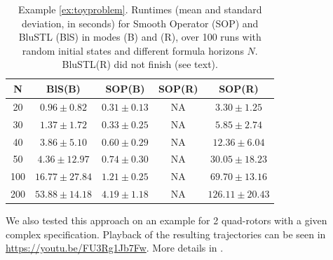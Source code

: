\begin{table}[tb]
\small
\begin{center}
\caption{{\small Example \ref{ex:toyproblem}. Runtimes (mean and standard deviation, in seconds) for Smooth Operator (SOP) and BluSTL (BlS) in modes (B) and (R), over 100 runs with random initial states and different formula horizons $N$. BluSTL(R) did not finish (see text).}}
\vspace{-5pt}
\label{tbl:time_performance_toy}
\begin{tabular} {|c|c|c|c|c|}
	\hline
	N & BlS(B) & SOP(B) & SOP(R) & SOP(R) \\ \hline
	20 & $0.96 \pm 0.82$ &  $\mathbf{0.31 \pm 0.13}$  & NA & $3.30 \pm 1.25$ \\ \hline
	30 & $1.37 \pm 1.72$ &  $\mathbf{0.33 \pm 0.25}$  & NA & $5.85 \pm 2.74$\\ \hline
	40 & $3.86 \pm 5.10$ &  $\mathbf{0.60 \pm 0.29}$  & NA & $12.36 \pm 6.04$\\ \hline
	50 & $4.36 \pm 12.97$&  $\mathbf{0.74 \pm 0.30}$ & NA & $30.05 \pm 18.23$\\ \hline
	100& $16.77 \pm 27.84$ & $\mathbf{1.21 \pm 0.25}$ & NA & $69.70 \pm 13.16$ \\ \hline
	200& $53.88 \pm 14.18$& $\mathbf{4.19 \pm 1.18}$ & NA & $126.11 \pm 20.43$ \\ \hline
\end{tabular}	
\end{center}
\end{table}

\begin{exmp}
We also tested this approach on an example for 2 quad-rotors with a given complex specification. Playback of the resulting trajectories can be seen in \protect\url{https://youtu.be/FU3Rg1Jb7Fw}. More details in \cite{PantAM17_SmoothOpTechRpt}.
\end{exmp}